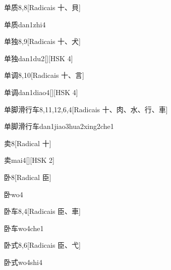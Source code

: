 \begin{entry}{单质}{8,8}[Radicais ⼗、⾙]
  \begin{phonetics}{单质}{dan1zhi4}
  \end{phonetics}
\end{entry}

\begin{entry}{单独}{8,9}[Radicais ⼗、⽝]
  \begin{phonetics}{单独}{dan1du2}[][HSK 4]
  \end{phonetics}
\end{entry}

\begin{entry}{单调}{8,10}[Radicais ⼗、⾔]
  \begin{phonetics}{单调}{dan1diao4}[][HSK 4]
  \end{phonetics}
\end{entry}

\begin{entry}{单脚滑行车}{8,11,12,6,4}[Radicais ⼗、⾁、⽔、⾏、⾞]
  \begin{phonetics}{单脚滑行车}{dan1jiao3hua2xing2che1}
  \end{phonetics}
\end{entry}

\begin{entry}{卖}{8}[Radical ⼗]
  \begin{phonetics}{卖}{mai4}[][HSK 2]
  \end{phonetics}
\end{entry}

\begin{entry}{卧}{8}[Radical ⾂]
  \begin{phonetics}{卧}{wo4}
  \end{phonetics}
\end{entry}

\begin{entry}{卧车}{8,4}[Radicais ⾂、⾞]
  \begin{phonetics}{卧车}{wo4che1}
  \end{phonetics}
\end{entry}

\begin{entry}{卧式}{8,6}[Radicais ⾂、⼷]
  \begin{phonetics}{卧式}{wo4shi4}
  \end{phonetics}
\end{entry}

